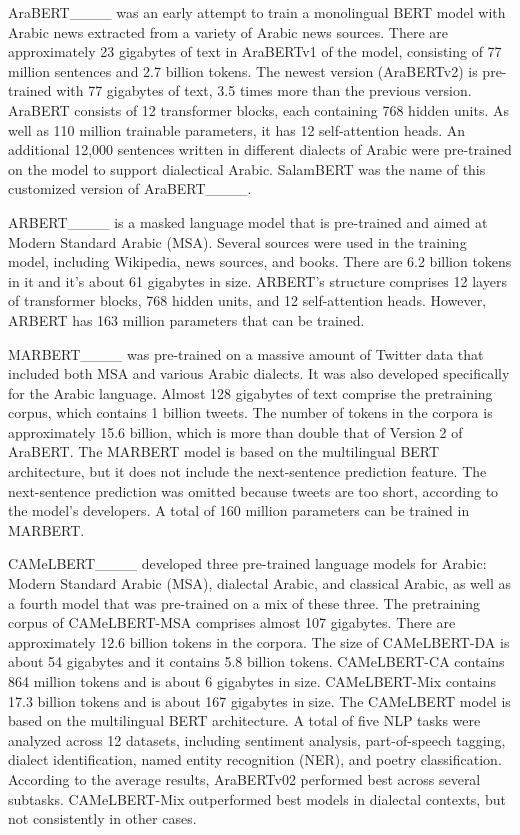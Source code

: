 AraBERT____ was an early attempt to train a monolingual BERT model with Arabic news extracted from a variety of Arabic news sources. There are approximately 23 gigabytes of text in AraBERTv1 of the model, consisting of 77 million sentences and 2.7 billion tokens.  The newest version (AraBERTv2) is pre-trained with 77 gigabytes of text, 3.5 times more than the previous version. AraBERT consists of 12 transformer blocks, each containing 768 hidden units. As well as 110 million trainable parameters, it has 12 self-attention heads. An additional 12,000 sentences written in different dialects of Arabic were pre-trained on the model to support dialectical Arabic. SalamBERT was the name of this customized version of AraBERT____.

ARBERT____ is a masked language model that is pre-trained and aimed at Modern Standard Arabic (MSA). Several sources were used in the training model, including Wikipedia, news sources, and books. There are 6.2 billion tokens in it and it's about 61 gigabytes in size. ARBERT's structure comprises 12 layers of transformer blocks, 768 hidden units, and 12 self-attention heads. However, ARBERT has 163 million parameters that can be trained.

MARBERT____ was pre-trained on a massive amount of Twitter data that included both MSA and various Arabic dialects. It was also developed specifically for the Arabic language. Almost 128 gigabytes of text comprise the pretraining corpus, which contains 1 billion tweets. The number of tokens in the corpora is approximately 15.6 billion, which is more than double that of Version 2 of AraBERT. The MARBERT model is based on the multilingual BERT architecture, but it does not include the next-sentence prediction feature. The next-sentence prediction was omitted because tweets are too short, according to the model's developers. A total of 160 million parameters can be trained in MARBERT.

CAMeLBERT____ developed three pre-trained language models for Arabic: Modern Standard Arabic (MSA), dialectal Arabic, and classical Arabic, as well as a fourth model that was pre-trained on a mix of these three. The pretraining corpus of CAMeLBERT-MSA comprises almost 107 gigabytes. There are approximately 12.6 billion tokens in the corpora. The size of CAMeLBERT-DA is about 54 gigabytes and it contains 5.8 billion tokens. CAMeLBERT-CA contains 864 million tokens and is about 6 gigabytes in size. CAMeLBERT-Mix contains 17.3 billion tokens and is about 167 gigabytes in size. The CAMeLBERT model is based on the multilingual BERT architecture. A total of five NLP tasks were analyzed across 12 datasets, including sentiment analysis, part-of-speech tagging, dialect identification, named entity recognition (NER), and poetry classification. According to the average results, AraBERTv02 performed best across several subtasks. CAMeLBERT-Mix outperformed best models in dialectal contexts, but not consistently in other cases.

